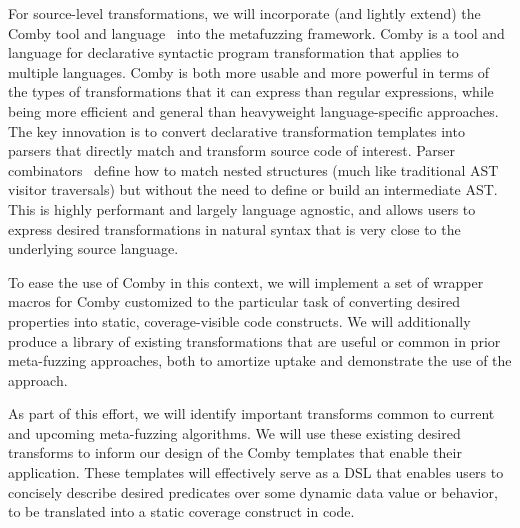 For source-level transformations, we will incorporate (and lightly extend) the
Comby tool and language~\cite{rvt-ppc,comby-github} into the metafuzzing
framework.  Comby is a tool and language for declarative syntactic program
transformation that applies to multiple languages. Comby is both more usable and
more powerful in terms of the types of transformations that it can express than
regular expressions, while being more efficient and general than heavyweight
language-specific approaches. The key innovation is to convert declarative
transformation templates into parsers that directly match and transform source
code of interest. Parser combinators~\cite{Hutton96monadicparser} define how to
match nested structures (much like traditional AST visitor traversals) but
without the need to define or build an intermediate AST. This is highly
performant and largely language agnostic, and allows users to express desired
transformations in natural syntax that is very close to the underlying source
language. 

To ease the use of Comby in this context, we will implement a set of wrapper
macros for Comby customized to the particular task of converting desired
properties into static, coverage-visible code constructs.  We will additionally
produce a library of existing transformations that are useful or common in prior
meta-fuzzing approaches, both to amortize uptake and demonstrate the use of the
approach.  

As part of this effort, we will identify important transforms common to current
and upcoming meta-fuzzing algorithms.  We will use these existing desired
transforms to inform our design of the Comby templates that enable their
application. These templates will effectively serve as a DSL that enables users
to concisely describe desired predicates over some dynamic data value or
behavior, to be translated into a static coverage construct in code. 





